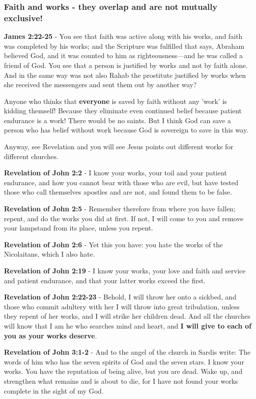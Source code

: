 \documentclass[11pt]{article}
\begin{document}
\subsubsection{Faith and works - they overlap and are \textbf{not} mutually exclusive!}
\label{sec:org40a776d}
\textbf{James 2:22-25} - You see that faith was active along with his works, and faith was completed by his works; and the Scripture was fulfilled that says, Abraham believed God, and it was counted to him as righteousness—and he was called a friend of God.  You see that a person is justified by works and not by faith alone.  And in the same way was not also Rahab the prostitute justified by works when she received the messengers and sent them out by another way?

Anyone who thinks that \textbf{everyone} is saved by faith without any 'work' is kidding themself!
Because they eliminate even continued belief because patient endurance is a work!
There would be no saints.
But I think God can save a person who has belief without work because God is sovereign to save in this way.

Anyway, see Revelation and you will see Jesus points out different works for different churches.

\textbf{Revelation of John 2:2} - I know your works, your toil and your patient endurance, and how you cannot bear with those who are evil, but have tested those who call themselves apostles and are not, and found them to be false.

\textbf{Revelation of John 2:5} - Remember therefore from where you have fallen; repent, and do the works you did at first. If not, I will come to you and remove your lampstand from its place, unless you repent.

\textbf{Revelation of John 2:6} - Yet this you have: you hate the works of the Nicolaitans, which I also hate.

\textbf{Revelation of John 2:19} - I know your works, your love and faith and service and patient endurance, and that your latter works exceed the first.

\textbf{Revelation of John 2:22-23} - Behold, I will throw her onto a sickbed, and those who commit adultery with her I will throw into great tribulation, unless they repent of her works, and I will strike her children dead. And all the churches will know that I am he who searches mind and heart, and \textbf{I will give to each of you as your works deserve}.

\textbf{Revelation of John 3:1-2} - And to the angel of the church in Sardis write: The words of him who has the seven spirits of God and the seven stars. I know your works. You have the reputation of being alive, but you are dead. Wake up, and strengthen what remains and is about to die, for I have not found your works complete in the sight of my God.
\end{document}
